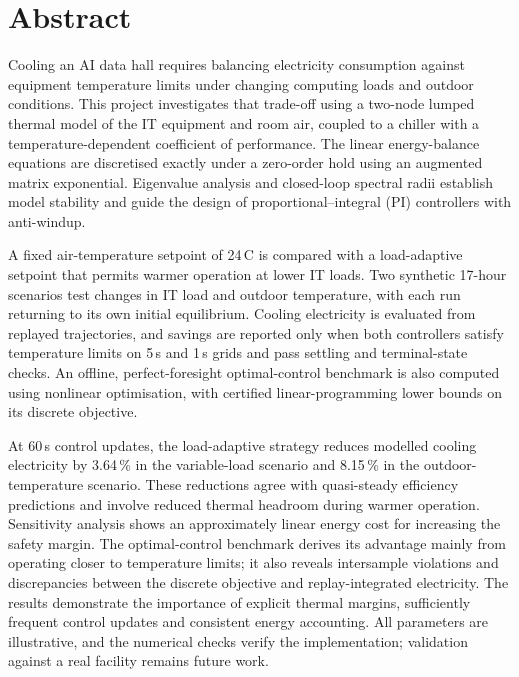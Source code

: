 \documentclass[12pt,a4paper]{report}
\theoremstyle{definition}
\begin{document}
\chapter*{Abstract}
Cooling an AI data hall requires balancing electricity consumption against equipment temperature limits under changing computing loads and outdoor conditions. This project investigates that trade-off using a two-node lumped thermal model of the IT equipment and room air, coupled to a chiller with a temperature-dependent coefficient of performance. The linear energy-balance equations are discretised exactly under a zero-order hold using an augmented matrix exponential. Eigenvalue analysis and closed-loop spectral radii establish model stability and guide the design of proportional--integral (PI) controllers with anti-windup.

A fixed air-temperature setpoint of 24\,\textdegree C is compared with a load-adaptive setpoint that permits warmer operation at lower IT loads. Two synthetic 17-hour scenarios test changes in IT load and outdoor temperature, with each run returning to its own initial equilibrium. Cooling electricity is evaluated from replayed trajectories, and savings are reported only when both controllers satisfy temperature limits on 5\,s and 1\,s grids and pass settling and terminal-state checks. An offline, perfect-foresight optimal-control benchmark is also computed using nonlinear optimisation, with certified linear-programming lower bounds on its discrete objective.

At 60\,s control updates, the load-adaptive strategy reduces modelled cooling electricity by 3.64\,\% in the variable-load scenario and 8.15\,\% in the outdoor-temperature scenario. These reductions agree with quasi-steady efficiency predictions and involve reduced thermal headroom during warmer operation. Sensitivity analysis shows an approximately linear energy cost for increasing the safety margin. The optimal-control benchmark derives its advantage mainly from operating closer to temperature limits; it also reveals intersample violations and discrepancies between the discrete objective and replay-integrated electricity. The results demonstrate the importance of explicit thermal margins, sufficiently frequent control updates and consistent energy accounting. All parameters are illustrative, and the numerical checks verify the implementation; validation against a real facility remains future work.
\end{document}
